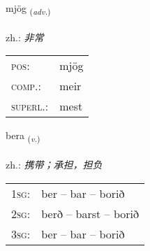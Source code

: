 \documentclass[frontgrid, backgrid]{flacards}\usepackage[]{graphicx}\usepackage[]{xcolor}
\begin{document}
\renewcommand{\flhead}{\vskip5pt \fboxsep=0pt {\small\bfseries\footnotesize Atviksorð | 副词}}
\renewcommand{\fcfoot}{\vskip5pt \fboxsep=0pt \hspace{2pt}{\small\bfseries\footnotesize 1K}}

\renewcommand{\blhead}{\vskip5pt {\small\bfseries\footnotesize Atviksorð | 副词 }}
\renewcommand{\bcfoot}{\vskip5pt \hspace{2pt}{\small\bfseries\footnotesize 1K}}


{mjög \small{\textsubscript{(\textit{adv.})}} \\[1ex] %
\textphonetic{[mjœːɣ]} \\
zh.: \emph{非常} \\  [2ex]
\renewcommand*{\arraystretch}{0.8}
\begin{tabular}{ll}
\textsc{pos}: & mjög \\ 
\textsc{comp.}: & meir \\ 
\textsc{superl.}: & mest \\
\end{tabular}
}

\renewcommand{\flhead}{\vskip5pt \fboxsep=0pt {\small\bfseries\footnotesize Sagnorð | 动词}}
\renewcommand{\fcfoot}{\vskip5pt \fboxsep=0pt \hspace{2pt}{\small\bfseries\footnotesize 1K}}

\renewcommand{\blhead}{\vskip5pt {\small\bfseries\footnotesize Sagnorð | 动词 }}
\renewcommand{\bcfoot}{\vskip5pt \hspace{2pt}{\small\bfseries\footnotesize 1K}}


{bera \small{\textsubscript{(\textit{v.})}} \\[1ex] %
\textphonetic{[pɛːra]} \\
zh.: \emph{携带；承担，担负} \\  [2ex]
\renewcommand*{\arraystretch}{0.8}
\begin{tabular}{p{1cm}l}
\textsc{1sg}: & ber -- bar -- borið \\ 
\textsc{2sg}: & berð -- barst -- borið \\ 
\textsc{3sg}: & ber -- bar -- borið \\ 
\end{tabular}
}
\end{document}

